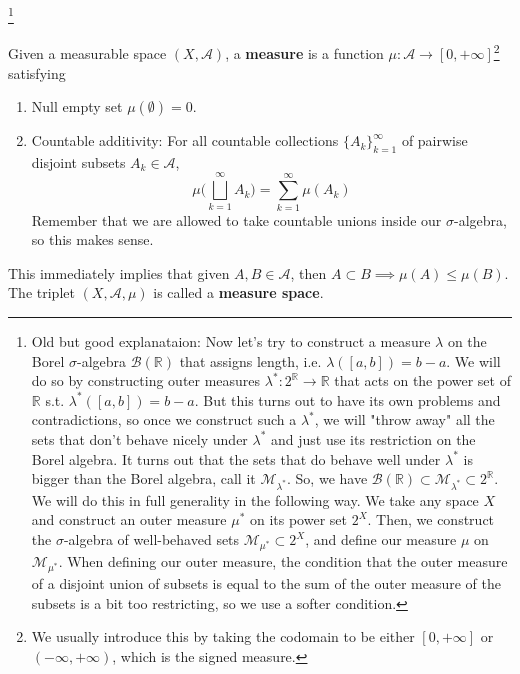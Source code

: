   \footnote{Old but good explanataion: Now let's try to construct a measure $\lambda$ on the Borel $\sigma$-algebra $\mathcal{B}(\mathbb{R})$ that assigns length, i.e. $\lambda([a, b]) = b - a$. We will do so by constructing outer measures $\lambda^*: 2^\mathbb{R} \longrightarrow \mathbb{R}$ that acts on the power set of $\mathbb{R}$ s.t. $\lambda^*([a, b]) = b - a$. But this turns out to have its own problems and contradictions, so once we construct such a $\lambda^*$, we will "throw away" all the sets that don't behave nicely under $\lambda^*$ and just use its restriction on the Borel algebra. It turns out that the sets that do behave well under $\lambda^*$ is bigger than the Borel algebra, call it $\mathcal{M}_{\lambda^*}$. So, we have $\mathcal{B}(\mathbb{R}) \subset \mathcal{M}_{\lambda^*} \subset 2^\mathbb{R}$. We will do this in full generality in the following way. We take any space $X$ and construct an outer measure $\mu^*$ on its power set $2^X$. Then, we construct the $\sigma$-algebra of well-behaved sets $\mathcal{M}_{\mu^*} \subset 2^X$, and define our measure $\mu$ on $\mathcal{M}_{\mu^*}$. When defining our outer measure, the condition that the outer measure of a disjoint union of subsets is equal to the sum of the outer measure of the subsets is a bit too restricting, so we use a softer condition. }

  \begin{definition}[Measure]
    Given a measurable space $(X, \mathcal{A})$, a \textbf{measure} is a function $\mu : \mathcal{A} \longrightarrow [0, +\infty]$\footnote{We usually introduce this by taking the codomain to be either $[0, +\infty]$ or $(-\infty, +\infty)$, which is the signed measure.} satisfying 
    \begin{enumerate}
      \item Null empty set $\mu(\emptyset) = 0$. 
      \item Countable additivity: 
        For all countable collections $\{A_k\}_{k=1}^\infty$ of pairwise disjoint subsets $A_k \in \mathcal{A}$, 
      \begin{equation}
        \mu \bigg( \bigsqcup_{k=1}^\infty A_k \bigg) = \sum_{k=1}^\infty \mu(A_k)
      \end{equation}
      Remember that we are allowed to take countable unions inside our $\sigma$-algebra, so this makes sense. 
    \end{enumerate}
    This immediately implies that given $A, B \in \mathcal{A}$, then $A \subset B \implies \mu(A) \leq \mu(B)$. The triplet $(X, \mathcal{A}, \mu)$ is called a \textbf{measure space}. 
  \end{definition}

